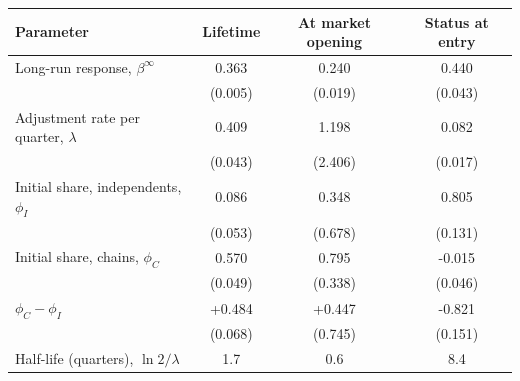 \begin{tabular}{@{}lccc@{}}
\toprule
Parameter & Lifetime & At market opening & Status at entry \\
\midrule
Long-run response, $\beta^\infty$ & 0.363 & 0.240 & 0.440 \\
 & (0.005) & (0.019) & (0.043) \\
Adjustment rate per quarter, $\lambda$ & 0.409 & 1.198 & 0.082 \\
 & (0.043) & (2.406) & (0.017) \\
Initial share, independents, $\phi_I$ & 0.086 & 0.348 & 0.805 \\
 & (0.053) & (0.678) & (0.131) \\
Initial share, chains, $\phi_C$ & 0.570 & 0.795 & -0.015 \\
 & (0.049) & (0.338) & (0.046) \\
$\phi_C-\phi_I$ & +0.484 & +0.447 & -0.821 \\
 & (0.068) & (0.745) & (0.151) \\
Half-life (quarters), $\ln 2/\lambda$ & 1.7 & 0.6 & 8.4 \\
\bottomrule
\end{tabular}
